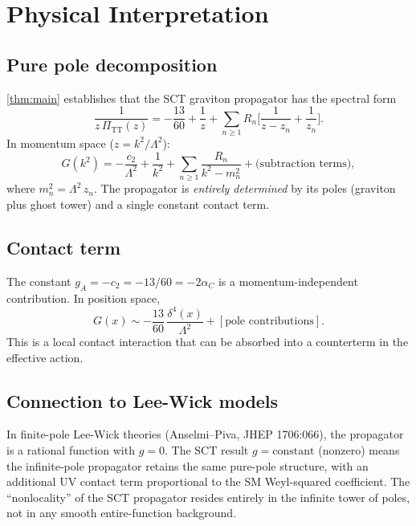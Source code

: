 \documentclass[11pt,a4paper]{article}
\newcommand{\PiTT}{\Pi_{\mathrm{TT}}}
\begin{document}
\section{Physical Interpretation}
\label{sec:physical}

\subsection{Pure pole decomposition}

\cref{thm:main} establishes that the SCT graviton propagator has the
spectral form
\begin{equation}\label{eq:spectral}
  \frac{1}{z\,\PiTT(z)} = -\frac{13}{60}
    + \frac{1}{z}
    + \sum_{n \geq 1} R_n \biggl[\frac{1}{z - z_n} + \frac{1}{z_n}\biggr].
\end{equation}
In momentum space ($z = k^2/\Lambda^2$):
\begin{equation}
  G(k^2) = -\frac{c_2}{\Lambda^2}
    + \frac{1}{k^2}
    + \sum_{n \geq 1} \frac{R_n}{k^2 - m_n^2}
    + \text{(subtraction terms)},
\end{equation}
where $m_n^2 = \Lambda^2\,z_n$.  The propagator is \emph{entirely
determined} by its poles (graviton plus ghost tower) and a single
constant contact term.

\subsection{Contact term}

The constant $g_A = -c_2 = -13/60 = -2\alpha_C$ is a
momentum-independent contribution.  In position space,
\[
  G(x) \sim -\frac{13}{60}\,\frac{\delta^4(x)}{\Lambda^2}
    + [\text{pole contributions}].
\]
This is a local contact interaction that can be absorbed into a
counterterm in the effective action.

\subsection{Connection to Lee-Wick models}

In finite-pole Lee-Wick theories (Anselmi--Piva, JHEP 1706:066),
the propagator is a rational function with $g = 0$.  The SCT result
$g = \text{constant}$ (nonzero) means the infinite-pole propagator
retains the same pure-pole structure, with an additional UV contact
term proportional to the SM Weyl-squared coefficient.  The
``nonlocality'' of the SCT propagator resides entirely in the
infinite tower of poles, not in any smooth entire-function background.
\end{document}
